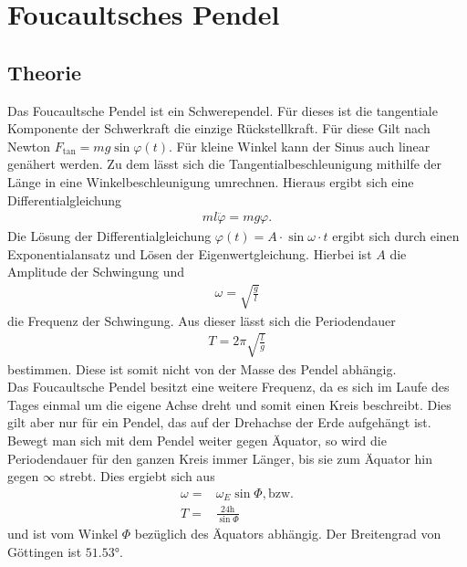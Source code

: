 \documentclass[12pt,a4paper,titlepage,headinclude]{scrartcl}
\numberwithin{equation}{subsection}
\begin{document}
\section{Foucaultsches Pendel}

\subsection{Theorie}
Das Foucaultsche Pendel ist ein Schwerependel.
Für dieses ist die tangentiale Komponente der Schwerkraft die einzige Rückstellkraft.
Für diese Gilt nach Newton $F_\text{tan}=mg\sin{\varphi(t)}$.
Für kleine Winkel kann der Sinus auch linear genähert werden.
Zu dem lässt sich die Tangentialbeschleunigung mithilfe der Länge in eine Winkelbeschleunigung umrechnen.
Hieraus ergibt sich eine Differentialgleichung
\begin{align*}
	ml\ddot{\varphi}=mg\varphi.
\end{align*}
Die Lösung der Differentialgleichung $\varphi(t)=A\cdot\sin{\omega\cdot t}$ ergibt sich durch einen Exponentialansatz und Lösen der Eigenwertgleichung.
Hierbei ist $A$ die Amplitude der Schwingung und
\begin{align*}
	\omega=\sqrt{\frac{g}{l}}
\end{align*}
die Frequenz der Schwingung.
Aus dieser lässt sich die Periodendauer 
\begin{align}
	T=2\pi\sqrt{\frac{l}{g}}\label{eq:periode}
\end{align}
bestimmen.
Diese ist somit nicht von der Masse des Pendel abhängig.\\
Das Foucaultsche Pendel besitzt eine weitere Frequenz, da es sich im Laufe des Tages einmal um die eigene Achse dreht und somit einen Kreis beschreibt.
Dies gilt aber nur für ein Pendel, das auf der Drehachse der Erde aufgehängt ist.
Bewegt man sich mit dem Pendel weiter gegen Äquator, so wird die Periodendauer für den ganzen Kreis immer Länger, bis sie zum Äquator hin gegen $\infty$ strebt.
Dies ergiebt sich aus
\begin{align}
	\omega=&\omega_E\sin{\Phi}, \text{bzw.}\\
	T=&\frac{24\si{\hour}}{\sin{\Phi}}\label{eq:peri}
\end{align}
und ist vom Winkel $\Phi$ bezüglich des Äquators abhängig.
Der Breitengrad von Göttingen ist $51.53\si{\degree}$.
\end{document}
